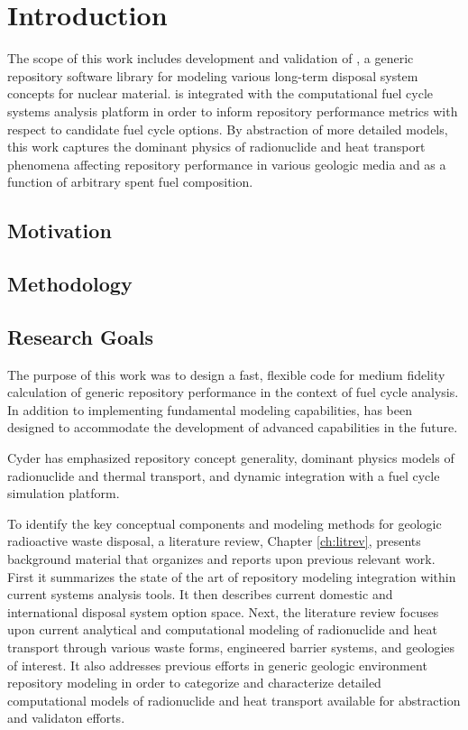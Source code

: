 \chapter{Introduction}\label{ch:introduction}


The scope of this work includes development and validation of \Cyder, a generic 
repository software library for modeling various long-term disposal system concepts 
for nuclear material. \Cyder is integrated with the \Cyclus 
computational fuel cycle systems analysis platform in order to inform 
repository performance metrics with respect to candidate fuel cycle options.  
By abstraction of more detailed models, this work captures the dominant physics 
of radionuclide and heat transport phenomena affecting repository performance 
in various geologic media and as a function of arbitrary spent fuel 
composition. 

\section{Motivation} 


\section{Methodology} 


\section{Research Goals}

The purpose of this work was to design a fast, flexible code for medium fidelity 
calculation of generic repository performance in the context of fuel cycle 
analysis. In addition to implementing fundamental modeling capabilities, \Cyder 
has been designed to accommodate the development of advanced capabilities in the 
future.

Cyder has emphasized repository concept generality, dominant physics models of 
radionuclide and thermal transport, and dynamic integration with a fuel cycle 
simulation platform.


To identify the key conceptual components and modeling methods for geologic 
radioactive waste disposal, a literature review, Chapter \ref{ch:litrev}, 
presents background material that organizes and reports upon previous relevant 
work. First it summarizes the state of the art of repository modeling 
integration within current systems analysis tools. It then describes current 
domestic and international disposal system option space.  Next, the literature 
review focuses upon current analytical and computational modeling of 
radionuclide and heat transport through various waste forms, engineered barrier 
systems, and geologies of interest.  It also addresses previous efforts in 
generic geologic environment repository modeling in order to categorize and 
characterize detailed computational models of radionuclide and heat transport 
available for abstraction and validaton efforts.

